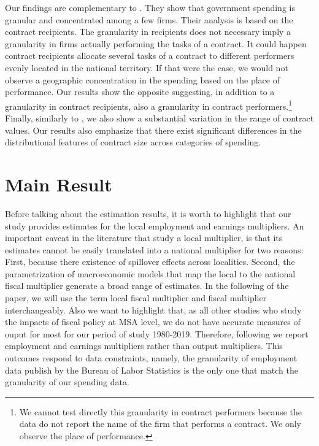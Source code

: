 \documentclass[dv_diss_main.tex]{subfiles}
\begin{document}
Our findings are complementary to \cite{Cox2021}. They show that government spending is granular and concentrated among a few firms. Their analysis is based on the contract recipients. The granularity in recipients does not necessary imply a granularity in firms actually performing the tasks of a contract. It could happen contract recipients allocate several tasks of a contract to different performers evenly located in the national territory. If that were the case, we would not observe a geographic concentration in the spending based on the place of performance. Our results show the opposite suggesting, in addition to a granularity in contract recipients, also a granularity in contract performers.\footnote{We cannot test directly this granularity in contract performers because the data do not report the name of the firm that performs a contract. We only observe the place of performance.} Finally, similarly to \cite{Cox2021}, we also show a substantial variation in the range of contract values. Our results also emphasize that there exist significant differences in the distributional features of contract size across categories of spending.



\section{Main Result}
\label{sec:emp_fm}

Before talking about the estimation results, it is worth to highlight that our study provides estimates for the local employment and earnings multipliers. An important caveat in the literature that study a local multiplier, is that its estimates cannot be easily translated into a national multiplier for two reasons: First, because there existence of spillover effects across localities. Second, the parametrization of macroeconomic models that map the local to the national fiscal multiplier generate a broad range of estimates. In the following of the paper, we will use the term local fiscal multiplier and fiscal multiplier interchangeably. Also we want to highlight that, as all other studies who study the impacts of fiscal policy at MSA level, we do not have accurate measures of ouput for most for our period of study 1980-2019. Therefore, following \cte{} we report employment and earnings multipliers rather than output multipliers. This outcomes respond to data constraints, namely, the granularity of employment data publish by the Bureau of Labor Statistics is the only one that match the granularity of our spending data. 
\end{document}
